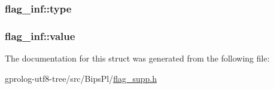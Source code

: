 \subsubsection[{\texorpdfstring{type}{type}}]{ flag\+\_\+inf\+::type}\hypertarget{structflag__inf_ad1ffc264915a45e9395b717849c36ff9}{}\label{structflag__inf_ad1ffc264915a45e9395b717849c36ff9}
\subsubsection[{\texorpdfstring{value}{value}}]{ flag\+\_\+inf\+::value}\hypertarget{structflag__inf_a828f0d058950ff9e708080d5e96b4068}{}\label{structflag__inf_a828f0d058950ff9e708080d5e96b4068}


The documentation for this struct was generated from the following file\+:\begin{DoxyCompactItemize}
\item 
gprolog-\/utf8-\/tree/src/\+Bips\+Pl/\hyperlink{flag__supp_8h}{flag\+\_\+supp.\+h}\end{DoxyCompactItemize}
